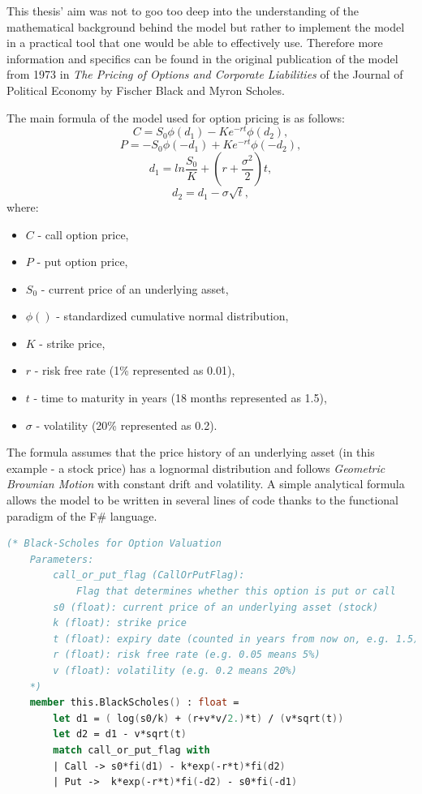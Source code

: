     This thesis' aim was not to goo too deep into the understanding of the mathematical background behind the model but rather to implement the model in a practical tool that one would be able to effectively use. Therefore more information and specifics can be found in the original publication \cite{10.2307/1831029} of the model from 1973 in \textit{The Pricing of Options and Corporate Liabilities} of the Journal of Political Economy by Fischer Black and Myron Scholes.
    
    The main formula of the model used for option pricing is as follows:
    \[
    C = S_0\phi(d_1) - Ke^{-rt}\phi(d_2)
    ,
    \]
    \[
    P = -S_0\phi(-d_1) + Ke^{-rt}\phi(-d_2)
    ,
    \]
    \[
    d_1 = ln\frac{S_0}{K} + (r+\frac{\sigma^2}{2})t
    ,
    \]
    \[
    d_2 = d_1 - \sigma\sqrt{t}
    ,
    \]
    where:
    \begin{itemize}
        \item $C$ - call option price,
        \item $P$ - put option price,
        \item $S_0$ - current price of an underlying asset,
        \item $\phi()$ - standardized cumulative normal distribution,
        \item $K$ - strike price,
        \item $r$ - risk free rate (1\% represented as 0.01),
        \item $t$ - time to maturity in years (18 months represented as 1.5),
        \item $\sigma$ - volatility (20\% represented as 0.2).
    \end{itemize}
    The formula assumes that the price history of an underlying asset (in this example - a stock price) has a lognormal distribution and follows \textit{Geometric Brownian Motion} with constant drift and volatility. 
    A simple analytical formula allows the model to be written in several lines of code thanks to the functional paradigm of the F\# language.
    \begin{lstlisting}[language=FSharp, label={lst:bsm}, caption=F\# implementation of \textit{Black--Scholes Model}.]
    (* Black-Scholes for Option Valuation
    Parameters:
        call_or_put_flag (CallOrPutFlag):
            Flag that determines whether this option is put or call
        s0 (float): current price of an underlying asset (stock)
        k (float): strike price
        t (float): expiry date (counted in years from now on, e.g. 1.5)
        r (float): risk free rate (e.g. 0.05 means 5%)
        v (float): volatility (e.g. 0.2 means 20%)
    *)
    member this.BlackScholes() : float =
        let d1 = ( log(s0/k) + (r+v*v/2.)*t) / (v*sqrt(t))
        let d2 = d1 - v*sqrt(t)
        match call_or_put_flag with
        | Call -> s0*fi(d1) - k*exp(-r*t)*fi(d2)
        | Put ->  k*exp(-r*t)*fi(-d2) - s0*fi(-d1)
    \end{lstlisting}